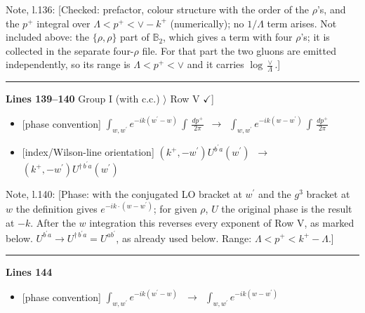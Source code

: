 \documentclass[10pt]{article}
\newenvironment{notebox}{\def\FrameCommand{{\color{notebar}\vrule width 1.5pt}\hspace{6pt}}\MakeFramed{\advance\hsize-\width\FrameRestore}\small}{\endMakeFramed}
\def\mf#1{\mathbb{#1}}
\begin{document}
\begin{notebox}\textsf{\small Note, l.136:} [Checked: prefactor, colour structure with the order of the $\rho$'s, and the $p^+$ integral over $\Lambda<p^+<\vee-k^+$ (numerically); no $1/\Lambda$ term arises. Not included above: the $\{\rho,\rho\}$ part of $\mf{B}_2$, which gives a term with four $\rho$'s; it is collected in the separate four-$\rho$ file. For that part the two gluons are emitted independently, so its range is $\Lambda<p^+<\vee$ and it carries $\log\frac{\vee}{\Lambda}$.]\end{notebox}
\noindent\rule{\linewidth}{0.3pt}\par\noindent\textbf{Lines 139--140} \quad \textsf{Group I (with c.c.) $\rangle$ Row V { $\checkmark$]}} \par
\begin{itemize}[leftmargin=2.2em,itemsep=1pt,topsep=2pt]
\item[\textbf{l.139}] \textsf{\small [phase convention]} $\displaystyle \int_{w, w^\prime} e^{-ik(w^\prime-w)}\, \int\, \frac{dp^{+}}{2\pi}$\ $\longrightarrow$\ $\displaystyle \int_{w, w^\prime} e^{-ik(w-w^\prime)}\, \int\, \frac{dp^{+}}{2\pi}$
\item[\textbf{l.139}] \textsf{\small [index/Wilson-line orientation]} $\displaystyle (k^{+},-w^{\prime})U^{b^{\prime}a}(w^{\prime})$\ $\longrightarrow$\ $\displaystyle (k^{+},-w^{\prime})U^{\dagger\, b^{\prime}a}(w^{\prime})$
\end{itemize}
\begin{notebox}\textsf{\small Note, l.140:} [Phase: with the conjugated LO bracket at $w^\prime$ and the $g^{3}$ bracket at $w$ the definition gives $e^{-ik\cdot(w-w^\prime)}$; for given $\rho$, $U$ the original phase is the result at $-k$. After the $w$ integration this reverses every exponent of Row V, as marked below. $U^{b^\prime a}\to U^{\dagger\, b^\prime a}=U^{ab^\prime}$, as already used below. Range: $\Lambda<p^{+}<k^{+}-\Lambda$.]\end{notebox}
\noindent\rule{\linewidth}{0.3pt}\par\noindent\textbf{Lines 144} \par
\begin{itemize}[leftmargin=2.2em,itemsep=1pt,topsep=2pt]
\item[\textbf{l.144}] \textsf{\small [phase convention]} $\displaystyle \int_{w, w^\prime} e^{-ik(w^\prime-w)}\,$\ $\longrightarrow$\ $\displaystyle \int_{w, w^\prime} e^{-ik(w-w^\prime)}\,$
\end{itemize}
\end{document}
